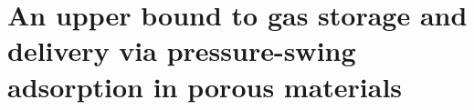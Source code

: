 \chapter{An upper bound to gas storage and delivery via pressure-swing
adsorption in porous materials}


